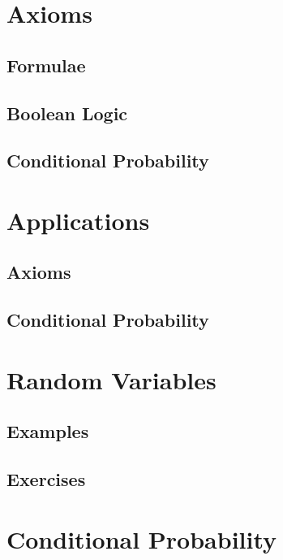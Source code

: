 \documentclass[journal]{IEEEtran}
\begin{document}
\renewcommand{\thetable}{\theenumi}


\section{Axioms}
\subsection{Formulae}

\subsection{Boolean Logic}

\subsection{Conditional Probability}

\section{Applications}
\subsection{Axioms}

\subsection{Conditional Probability}

\section{Random Variables}
\subsection{Examples}

\subsection{Exercises}

\section{Conditional Probability}
\end{document}
